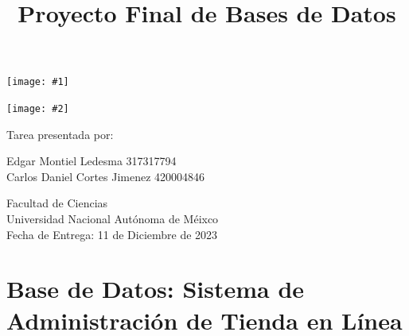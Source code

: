 \documentclass[12pt]{article}
\title{\vspace{1cm}Proyecto Final de Bases de Datos}
\date{} %
\newcommand{\doubleshield}[2]{%
    \begin{minipage}[t]{0.48\textwidth}
        \centering
        \texttt{[image: \#1]}
        \par\vspace{1ex}
    \end{minipage}\hfill%
    \begin{minipage}[t]{0.48\textwidth}
        \centering
        \texttt{[image: \#2]}
        \par\vspace{1ex}
    \end{minipage}%
}
\begin{document}


\pagecolor{black}
\color{white}

\begin{titlepage}
    \begin{center}
        \vspace*{2cm}
        
        \doubleshield{UNAM.png}{EFC.png}
        
        \vspace{2cm}
        
        \Huge{\thetitle}
        
        \vspace{4cm}
        
        \Large{Tarea presentada por:}
        
        \vspace{0.5cm}
        
        \Large{Edgar Montiel Ledesma 317317794 \\ Carlos Daniel Cortes Jimenez 420004846}
        
        \vfill
        
        Facultad de Ciencias \\
        Universidad Nacional Autónoma de Méixco \\
        Fecha de Entrega: 11 de Diciembre de 2023 %
    \end{center}
\end{titlepage}
    
    \section*{Base de Datos: Sistema de Administración de Tienda en Línea}
\end{document}
